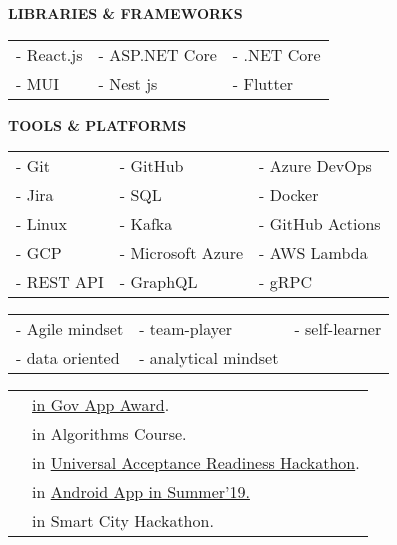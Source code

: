 \documentclass[10pt,a4paper,ragged2e]{altacv}
\begin{document}
\textcolor{VividPurple}{\textbf{LIBRARIES \& FRAMEWORKS}}
\smallskip

\begin{tabular}{ l l l } 
	- React.js & - ASP.NET Core & - .NET Core \\
	- MUI      & - Nest js      & - Flutter   \\ 
\end{tabular}
\smallskip

\textcolor{VividPurple}{\textbf{TOOLS \& PLATFORMS}}
\smallskip

\begin{tabular}{ l l l }
	- Git      & - GitHub          & - Azure DevOps   \\
	- Jira     & - SQL             & - Docker         \\ 
	- Linux    & - Kafka           & - GitHub Actions \\
	- GCP      & - Microsoft Azure & - AWS Lambda     \\
	- REST API & - GraphQL         & - gRPC           \\
\end{tabular}
\smallskip

\smallskip
\begin{tabular}{ l l l } 
	- Agile mindset & - team-player & - self-learner \\
	- data oriented     & - analytical mindset                     \\
\end{tabular}

\smallskip

\begin{tabular}{ l l }
	\faTrophy &  \href{https://www.linkedin.com/feed/update/urn:li:activity:6711649526421295104/}{in Gov App Award}.         \\
	\faTrophy &  in Algorithms Course.              \\ 
	\faTrophy &  in \href{https://www.linkedin.com/feed/update/urn:li:activity:6572611476543025152/}{Universal Acceptance Readiness Hackathon}.  \\
	\faTrophy &  in \href{https://www.facebook.com/permalink.php?story_fbid=2077703849203331 & id=1839142163059502}{Android App in Summer’19.} \\
	\faTrophy &  in Smart City Hackathon.               \\
\end{tabular}

\clearpage
\end{document}
